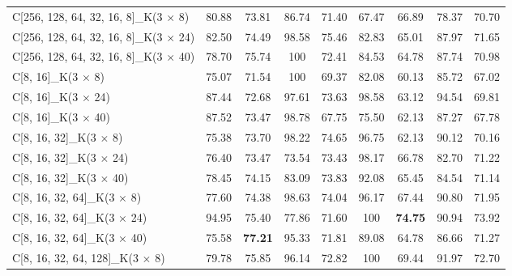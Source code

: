 \documentclass{ieeeaccess}
\begin{document}
{\begin{table*}[htb]
\begin{tabular}{|l|cc|cc|cc|cc|}
        C[256, 128, 64, 32, 16, 8]\_K(3 $\times$ 8)  &      80.88 &       73.81 &        86.74 &         71.40 &      67.47 &      66.89 &      78.37 &      70.70 \\
        C[256, 128, 64, 32, 16, 8]\_K(3 $\times$ 24) &      82.50 &       74.49 &        98.58 &         75.46 &      82.83 &      65.01 &      87.97 &      71.65 \\
        C[256, 128, 64, 32, 16, 8]\_K(3 $\times$ 40) &      78.70 &       75.74 &       100 &            72.41 &      84.53 &      64.78 &      87.74 &      70.98 \\
        \midrule\midrule  
        C[8, 16]\_K(3 $\times$ 8)                    &      75.07 &       71.54 &       100 &         69.37 &      82.08 &         60.13 &      85.72 &      67.02 \\
        C[8, 16]\_K(3 $\times$ 24)                   &      87.44 &       72.68 &        97.61 &         73.63 &      98.58 &      63.12 &      94.54 &      69.81 \\
        C[8, 16]\_K(3 $\times$ 40)                   &      87.52 &       73.47 &        98.78 &         67.75 &      75.50 &      62.13 &      87.27 &      67.78 \\
        C[8, 16, 32]\_K(3 $\times$ 8)                &      75.38 &       73.70 &        98.22 &         74.65 &      96.75 &      62.13 &      90.12 &      70.16 \\
        C[8, 16, 32]\_K(3 $\times$ 24)               &      76.40 &       73.47 &        73.54 &         73.43 &      98.17 &      66.78 &      82.70 &      71.22 \\
        C[8, 16, 32]\_K(3 $\times$ 40)               &      78.45 &       74.15 &        83.09 &         73.83 &      92.08 &      65.45 &      84.54 &      71.14 \\
        C[8, 16, 32, 64]\_K(3 $\times$ 8)            &      77.60 &       74.38 &        98.63 &         74.04 &      96.17 &      67.44 &      90.80 &      71.95 \\
        C[8, 16, 32, 64]\_K(3 $\times$ 24)           &      94.95 &       75.40 &        77.86 &         71.60 &     100 &  \textbf{74.75} &      90.94 &      73.92 \\
        C[8, 16, 32, 64]\_K(3 $\times$ 40)           &      75.58 & \textbf{77.21} &     95.33 &         71.81 &      89.08 &      64.78 &      86.66 &      71.27 \\
        C[8, 16, 32, 64, 128]\_K(3 $\times$ 8)       &      79.78 &       75.85 &        96.14 &         72.82 &     100 &         69.44 &      91.97 &      72.70 \\

\end{tabular}
\end{table*}}
\end{document}
